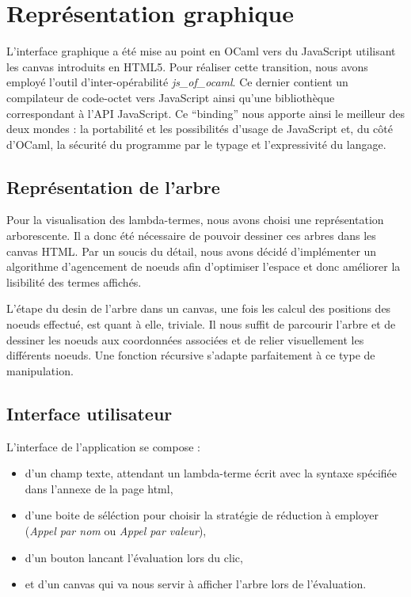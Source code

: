 \documentclass[a4paper, 11pt]{report}
\begin{document}
\chapter{Représentation graphique}

L'interface graphique a été mise au point en OCaml vers du JavaScript
utilisant les canvas introduits en HTML5. Pour réaliser cette
transition, nous avons employé l'outil d'inter-opérabilité
\emph{js\_of\_ocaml}. Ce dernier contient un compilateur de code-octet
vers JavaScript ainsi qu'une bibliothèque correspondant à l'API
JavaScript. Ce ``binding'' nous apporte ainsi le meilleur des deux
mondes : la portabilité et les possibilités d'usage de JavaScript et,
du côté d'OCaml, la sécurité du programme par le typage et
l'expressivité du langage.

\section{Représentation de l'arbre}

Pour la visualisation des lambda-termes, nous avons choisi une
représentation arborescente. Il a donc été nécessaire de pouvoir
dessiner ces arbres dans les canvas HTML. Par un soucis du détail,
nous avons décidé d'implémenter un algorithme d'agencement de noeuds
afin d'optimiser l'espace et donc améliorer la lisibilité des termes
affichés. 

L'étape du desin de l'arbre dans un canvas, une fois les calcul des
positions des noeuds effectué, est quant à elle, triviale. Il nous
suffit de parcourir l'arbre et de dessiner les noeuds aux coordonnées
associées et de relier visuellement les différents noeuds. Une
fonction récursive s'adapte parfaitement à ce type de manipulation.

\section{Interface utilisateur}

L'interface de l'application se compose : 
\begin{itemize}

\item d'un champ texte, attendant un lambda-terme écrit avec la
  syntaxe spécifiée dans l'annexe de la page html,

\item d'une boite de séléction pour choisir la stratégie de réduction
  à employer (\emph{Appel par nom} ou \emph{Appel par valeur}),

\item d'un bouton lancant l'évaluation lors du clic,

\item et d'un canvas qui va nous servir à afficher l'arbre lors de
  l'évaluation.
\end{itemize}
\end{document}

